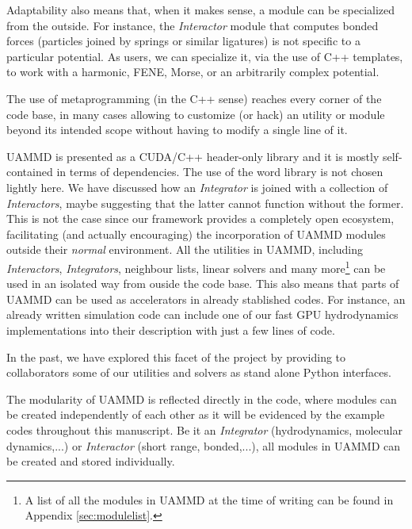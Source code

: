 \documentclass[ twoside,openright,titlepage,numbers=noenddot,%
headinclude,footinclude,cleardoublepage=empty,abstract=on,
BCOR=5mm,paper=a4,fontsize=11pt, dvipsnames
]{scrreprt}
\newcommand{\uammd}{\gls{UAMMD}\xspace}
\newcommand{\gpu}{\gls{GPU}\xspace}
\begin{document}
Adaptability also means that, when it makes sense, a module can be specialized from the outside. For instance, the \emph{Interactor} module that computes bonded forces (particles joined by springs or similar ligatures) is not specific to a particular potential. As users, we can specialize it, via the use of C++ templates, to work with a harmonic, FENE\cite{Warner1972}, Morse\cite{Morse1929}, or an arbitrarily complex potential.

The use of metaprogramming (in the C++ sense) reaches every corner of the code base, in many cases allowing to customize (or hack) an utility or module beyond its intended scope without having to modify a single line of it.

\uammd is presented as a CUDA/C++ header-only library and it is mostly self-contained in terms of dependencies. The use of the word library is not chosen lightly here. We have discussed how an \emph{Integrator} is joined with a collection of \emph{Interactors}, maybe suggesting that the latter cannot function without the former. This is not the case since our framework provides a completely open ecosystem, facilitating (and actually encouraging) the incorporation of \uammd modules outside their \emph{normal} environment.
All the utilities in \uammd, including \emph{Interactors}, \emph{Integrators}, neighbour lists, linear solvers and many more\footnote{A list of all the modules in \uammd at the time of writing can be found in Appendix \ref{sec:modulelist}.} can be used in an isolated way from ouside the code base. This also means that parts of \uammd can be used as accelerators in already stablished codes. For instance, an already written simulation code can include one of our fast \gpu hydrodynamics implementations into their description with just a few lines of code.

In the past, we have explored this facet of the project by providing to collaborators some of our utilities and solvers as stand alone Python interfaces.

The modularity of \uammd is reflected directly in the code, where modules can be created independently of each other as it will be evidenced by the example codes throughout this manuscript.
Be it an \emph{Integrator} (hydrodynamics, molecular dynamics,...) or \emph{Interactor} (short range, bonded,...), all modules in \uammd can be created and stored individually.
\end{document}

